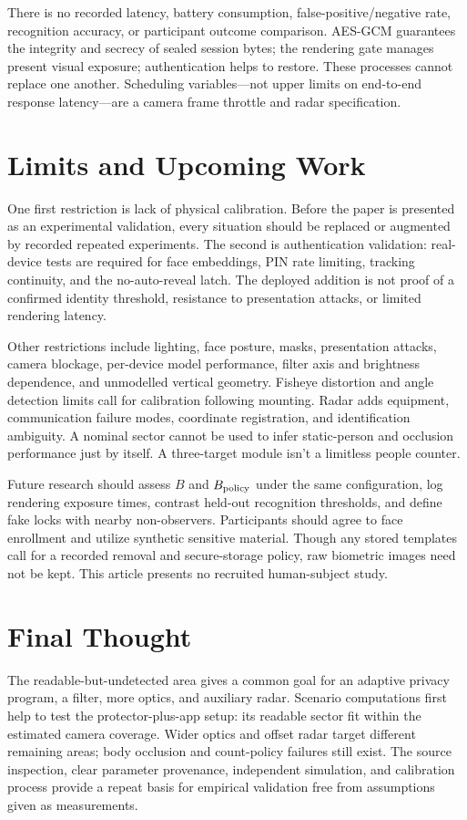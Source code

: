 \documentclass[conference]{IEEEtran}
\begin{document}
There is no recorded latency, battery consumption, false-positive/negative rate, recognition accuracy, or participant outcome comparison. AES-GCM guarantees the integrity and secrecy of sealed session bytes; the rendering gate manages present visual exposure; authentication helps to restore. These processes cannot replace one another. Scheduling variables—not upper limits on end-to-end response latency—are a camera frame throttle and radar specification.

\section{Limits and Upcoming Work}
One first restriction is lack of physical calibration. Before the paper is presented as an experimental validation, every situation should be replaced or augmented by recorded repeated experiments. The second is authentication validation: real-device tests are required for face embeddings, PIN rate limiting, tracking continuity, and the no-auto-reveal latch. The deployed addition is not proof of a confirmed identity threshold, resistance to presentation attacks, or limited rendering latency.

Other restrictions include lighting, face posture, masks, presentation attacks, camera blockage, per-device model performance, filter axis and brightness dependence, and unmodelled vertical geometry. Fisheye distortion and angle detection limits call for calibration following mounting. Radar adds equipment, communication failure modes, coordinate registration, and identification ambiguity. A nominal sector cannot be used to infer static-person and occlusion performance just by itself. A three-target module isn't a limitless people counter.

Future research should assess $B$ and $B_{\rm policy}$ under the same configuration, log rendering exposure times, contrast held-out recognition thresholds, and define fake locks with nearby non-observers. Participants should agree to face enrollment and utilize synthetic sensitive material. Though any stored templates call for a recorded removal and secure-storage policy, raw biometric images need not be kept. This article presents no recruited human-subject study.

\section{Final Thought}
The readable-but-undetected area gives a common goal for an adaptive privacy program, a filter, more optics, and auxiliary radar. Scenario computations first help to test the protector-plus-app setup: its readable sector fit within the estimated camera coverage. Wider optics and offset radar target different remaining areas; body occlusion and count-policy failures still exist. The source inspection, clear parameter provenance, independent simulation, and calibration process provide a repeat basis for empirical validation free from assumptions given as measurements.



\end{document}
